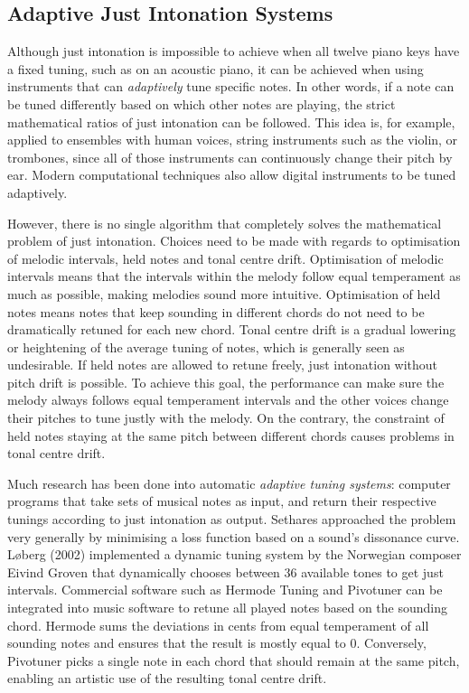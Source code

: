 \documentclass[a4paper]{article}
\begin{document}
\subsection{Adaptive Just Intonation Systems}
\label{intro_adaptive_ji}
Although just intonation is impossible to achieve when all twelve piano keys have a fixed tuning, such as on an acoustic piano, it can be achieved when using instruments that can \textit{adaptively} tune specific notes. In other words, if a note can be tuned differently based on which other notes are playing, the strict mathematical ratios of just intonation can be followed. This idea is, for example, applied to ensembles with human voices, string instruments such as the violin, or trombones, since all of those instruments can continuously change their pitch by ear. \cite{van_de_craats_fis_1989} Modern computational techniques also allow digital instruments to be tuned adaptively. \cite{sethares_adaptive_2005}

However, there is no single algorithm that completely solves the mathematical problem of just intonation. Choices need to be made with regards to optimisation of melodic intervals, held notes and tonal centre drift. Optimisation of melodic intervals means that the intervals within the melody follow equal temperament as much as possible, making melodies sound more intuitive. \cite{dougherty_choral_2004} Optimisation of held notes means notes that keep sounding in different chords do not need to be dramatically retuned for each new chord. Tonal centre drift is a gradual lowering or heightening of the average tuning of notes, which is generally seen as undesirable. \cite{barbershop_harmony_society_contest_2022} If held notes are allowed to retune freely, just intonation without pitch drift is possible. To achieve this goal, the performance can make sure the melody always follows equal temperament intervals and the other voices change their pitches to tune justly with the melody. \cite{dougherty_choral_2004} On the contrary, the constraint of held notes staying at the same pitch between different chords causes problems in tonal centre drift.

Much research has been done into automatic \textit{adaptive tuning systems}: computer programs that take sets of musical notes as input, and return their respective tunings according to just intonation as output. \cite{sethares_adaptive_2005} Sethares \cite{sethares_adaptive_1994} approached the problem very generally by minimising a loss function based on a sound's dissonance curve. Løberg (2002) implemented a dynamic tuning system by the Norwegian composer Eivind Groven that dynamically chooses between 36 available tones to get just intervals. \cite{code_grovenmax_2002} Commercial software such as Hermode Tuning \cite{mohrlok_hermode_2003} and Pivotuner \cite{volkov_pivotuner_2022} can be integrated into music software to retune all played notes based on the sounding chord. Hermode sums the deviations in cents from equal temperament of all sounding notes and ensures that the result is mostly equal to 0. Conversely, Pivotuner picks a single note in each chord that should remain at the same pitch, enabling an artistic use of the resulting tonal centre drift.
\end{document}
